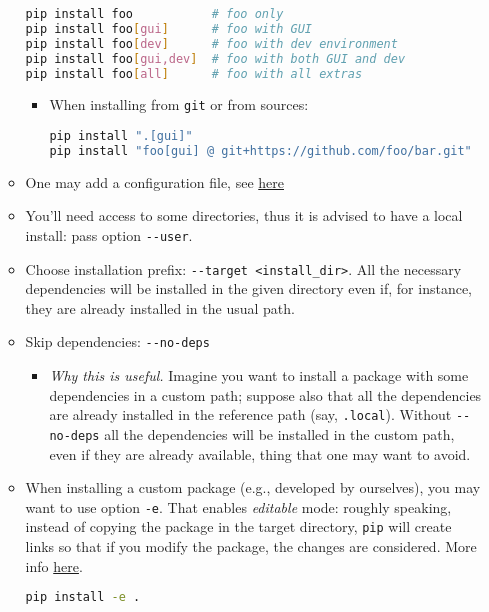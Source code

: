 \documentclass[a4paper,12pt,%
              final%
              ]{article}
\begin{document}
\begin{itemize}
\begin{itemize}
\begin{lstlisting}[language=bash]
pip install foo           # foo only
pip install foo[gui]      # foo with GUI
pip install foo[dev]      # foo with dev environment
pip install foo[gui,dev]  # foo with both GUI and dev
pip install foo[all]      # foo with all extras
\end{lstlisting}
        \begin{itemize}
          \item When installing from \texttt{git} or from sources:
\begin{lstlisting}[language=bash]
pip install ".[gui]"
pip install "foo[gui] @ git+https://github.com/foo/bar.git"
\end{lstlisting}
        \end{itemize}
      \item One may add a configuration file, see \href{https://pip.pypa.io/en/stable/topics/configuration/}{here}
      \item You'll need access to some directories, thus it is advised to have a local install: pass option \verb|--user|.
      \item Choose installation prefix: \verb|--target <install_dir>|. All the necessary dependencies will be installed in the given directory even if, for instance, they are already installed in the usual path.
      \item Skip dependencies: \verb|--no-deps|
        \begin{itemize}
          \item \emph{Why this is useful.} Imagine you want to install a package with some dependencies in a custom path; suppose also that all the dependencies are already installed in the reference path (say, \texttt{.local}). Without \verb|--no-deps| all the dependencies will be installed in the custom path, even if they are already available, thing that one may want to avoid.
        \end{itemize}
      \item When installing a custom package (e.g., developed by ourselves), you may want to use option \verb|-e|. That enables \emph{editable} mode: roughly speaking, instead of copying the package in the target directory, \texttt{pip} will create links so that if you modify the package, the changes are considered. More info \href{https://setuptools.pypa.io/en/latest/userguide/development_mode.html}{here}.
\begin{lstlisting}[language=bash]
pip install -e .
\end{lstlisting}

\end{itemize}
\end{itemize}
\end{document}
